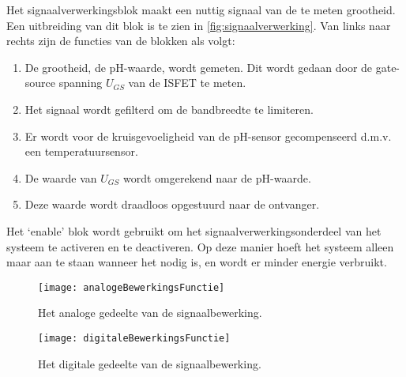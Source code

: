 
Het signaalverwerkingsblok maakt een nuttig signaal van de te meten grootheid. Een uitbreiding van dit blok is te zien in \cref{fig:signaalverwerking}.
Van links naar rechts zijn de functies van de blokken als volgt:
\begin{enumerate}
    \item De grootheid, de pH-waarde, wordt gemeten. Dit wordt gedaan door de gate-source spanning $U_{GS}$ van de ISFET te meten.
    \item Het signaal wordt gefilterd om de bandbreedte te limiteren.
    \item Er wordt voor de kruisgevoeligheid van de pH-sensor gecompenseerd d.m.v. een temperatuursensor.
    \item De waarde van $U_{GS}$ wordt omgerekend naar de pH-waarde.
    \item Deze waarde wordt draadloos opgestuurd naar de ontvanger.
\end{enumerate}
Het `enable' blok wordt gebruikt om het signaalverwerkingsonderdeel van het systeem te activeren en te deactiveren. Op deze manier hoeft het systeem alleen maar aan te staan wanneer het nodig is, en wordt er minder energie verbruikt.




\begin{figure}[!htb]
    \centering
    \texttt{[image: analogeBewerkingsFunctie]}
    \caption{Het analoge gedeelte van de signaalbewerking.}
    \label{fig:analogeBewerkingsFunctie}
\end{figure}


\begin{figure}[!htb]
    \centering
    \texttt{[image: digitaleBewerkingsFunctie]}
    \caption{Het digitale gedeelte van de signaalbewerking.}
    \label{fig:digitaleBewerkingsFunctie}
\end{figure}



